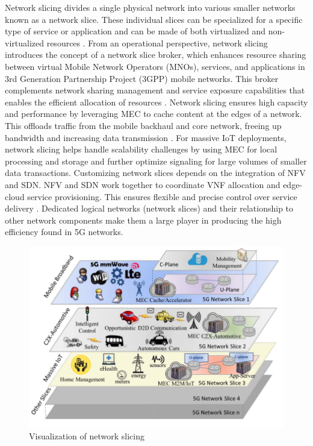 \documentclass[acmtog]{acmart}
\begin{document}
Network slicing divides a single physical network into various smaller networks known as a network slice. These individual slices can be specialized for a specific type of service or application and can be made of both virtualized and non-virtualized resources \cite{ref7_1}. From an operational perspective, network slicing introduces the concept of a network slice broker, which enhances resource sharing between virtual Mobile Network Operators (MNOs), services, and applications in 3rd Generation Partnership Project (3GPP) mobile networks. This broker complements network sharing management and service exposure capabilities that enables the efficient allocation of resources \cite{ref6_1}. Network slicing ensures high capacity and performance by leveraging MEC to cache content at the edges of a network. This offloads traffic from the mobile backhaul and core network, freeing up bandwidth and increasing data transmission \cite{ref6_1}. For massive IoT deployments, network slicing helps handle scalability challenges by using MEC for local processing and storage and further optimize signaling for large volumes of smaller data transactions. Customizing network slices depends on the integration of NFV and SDN. NFV and SDN work together to coordinate VNF allocation and edge-cloud service provisioning. This ensures flexible and precise control over service delivery \cite{ref6_1}. Dedicated logical networks (network slices) and their relationship to other network components make them a large player in producing the high efficiency found in 5G networks.
\begin{figure}[h]
  \centering
  \includegraphics[width=\linewidth]{slice.png}
  \caption{Visualization of network slicing \cite{ref6_1}}
\end{figure}
\end{document}
